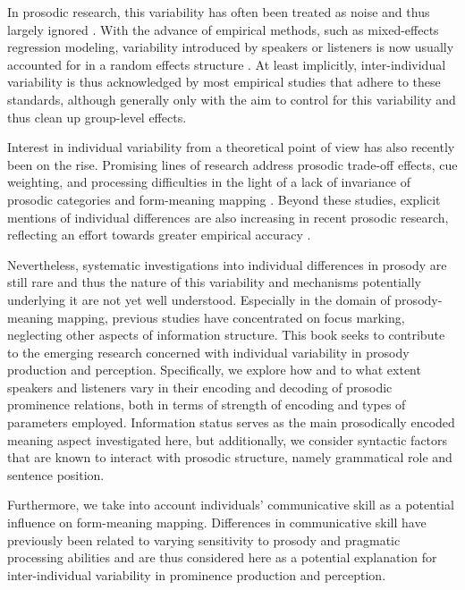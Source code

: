 In prosodic research, this variability has often been treated as noise and thus largely ignored \citep{arvanitiVariabilityOverlapCue2024}. With the advance of empirical methods, such as mixed-effects regression modeling, variability introduced by speakers or listeners is now usually accounted for in a random effects structure \citep[e.g.,][]{winterStatisticsLinguistsIntroduction2020, winterIndependenceGeneralizabilityLinguistics2021}. At least implicitly, inter-individual variability is thus acknowledged by most empirical studies that adhere to these standards, although generally only with the aim to control for this variability and thus clean up group-level effects.

Interest in individual variability from a theoretical point of view has also recently been on the rise. Promising lines of research address prosodic trade-off effects, cue weighting, and processing difficulties in the light of a lack of invariance of prosodic categories and form-meaning mapping \citep{kurumadaThinkingProbabilisticallyStudy2021, arvanitiVariabilityOverlapCue2024, severijnenYourVOORnaamNot2024}. Beyond these studies, explicit mentions of individual differences are also increasing in recent prosodic research, reflecting an effort towards greater empirical accuracy \citep[e.g.,][]{cangemiListenerSpecificPerceptionSpeakerSpecific2015, ouyangIndividualDifferencesProsodic2015, baumannWhatMakesWord2018, esteve-gibertEmpathyInfluencesHow2020}.

Nevertheless, systematic investigations into individual differences in prosody are still rare and thus the nature of this variability and mechanisms potentially underlying it are not yet well understood. Especially in the domain of prosody-meaning mapping, previous studies have concentrated on focus marking, neglecting other aspects of information structure. This book seeks to contribute to the emerging research concerned with individual variability in prosody production and perception. Specifically, we explore how and to what extent speakers and listeners vary in their encoding and decoding of prosodic prominence relations, both in terms of strength of encoding and types of parameters employed. Information status serves as the main prosodically encoded meaning aspect investigated here, but additionally, we consider syntactic factors that are known to interact with prosodic structure, namely grammatical role and sentence position. 

Furthermore, we take into account individuals' communicative skill as a potential influence on form-meaning mapping. Differences in communicative skill have previously been related to varying sensitivity to prosody \citep{bishopPhonologyPhoneticsSignalextrinsic2020, orricoInfluenceEmpathyAutisticlike2023} and pragmatic processing abilities \citep{nieuwlandIncrementalityPragmaticProcessing2010, zhaoAreScalarImplicatures2015} and are thus considered here as a potential explanation for inter-individual variability in prominence production and perception.

